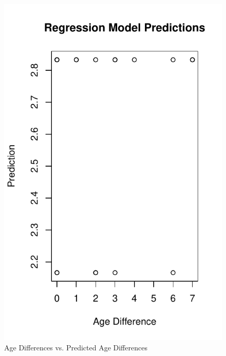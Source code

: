 \documentclass{paper}
\begin{document}
\begin{figure}
\centering
\includegraphics[width=\textwidth]{../Figures/predictions.pdf}
\caption{Age Differences vs. Predicted Age Differences}
\label{fig:pred}
\end{figure}




\end{document}
